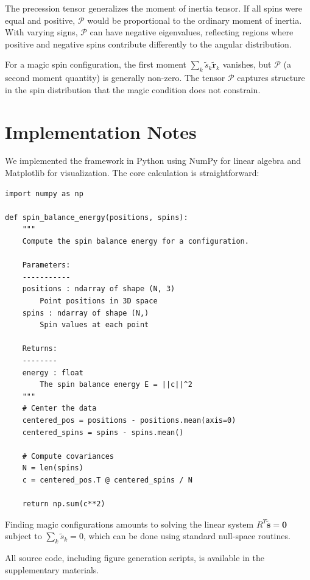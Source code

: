 \documentclass[11pt]{article}
\begin{document}
The precession tensor generalizes the moment of inertia tensor. If all spins were equal and positive, $\mathcal{P}$ would be proportional to the ordinary moment of inertia. With varying signs, $\mathcal{P}$ can have negative eigenvalues, reflecting regions where positive and negative spins contribute differently to the angular distribution.

For a magic spin configuration, the first moment $\sum_k \tilde{s}_k \tilde{\mathbf{r}}_k$ vanishes, but $\mathcal{P}$ (a second moment quantity) is generally non-zero. The tensor $\mathcal{P}$ captures structure in the spin distribution that the magic condition does not constrain.

\section{Implementation Notes}
\label{app:code}

We implemented the framework in Python using NumPy for linear algebra and Matplotlib for visualization. The core calculation is straightforward:

\begin{verbatim}
import numpy as np

def spin_balance_energy(positions, spins):
    """
    Compute the spin balance energy for a configuration.
    
    Parameters:
    -----------
    positions : ndarray of shape (N, 3)
        Point positions in 3D space
    spins : ndarray of shape (N,)
        Spin values at each point
        
    Returns:
    --------
    energy : float
        The spin balance energy E = ||c||^2
    """
    # Center the data
    centered_pos = positions - positions.mean(axis=0)
    centered_spins = spins - spins.mean()
    
    # Compute covariances
    N = len(spins)
    c = centered_pos.T @ centered_spins / N
    
    return np.sum(c**2)
\end{verbatim}

Finding magic configurations amounts to solving the linear system $R^T \tilde{\mathbf{s}} = \mathbf{0}$ subject to $\sum_k \tilde{s}_k = 0$, which can be done using standard null-space routines.

All source code, including figure generation scripts, is available in the supplementary materials.
\end{document}
